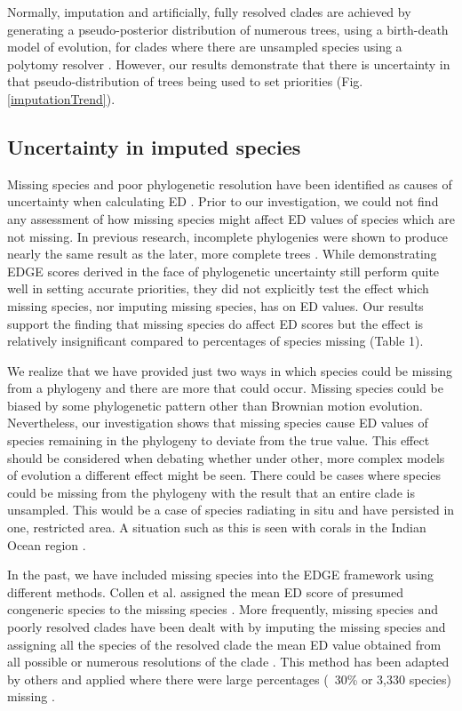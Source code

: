 \documentclass[12pt,english]{article}
\begin{document}
Normally, imputation and artificially, fully resolved clades are achieved by
generating a pseudo-posterior distribution of numerous trees, using a
birth-death model of evolution, for clades where there are unsampled species
using a polytomy resolver \autocite{Kuhn2011}. However, our results demonstrate
that there is uncertainty in that pseudo-distribution of trees being used to set
priorities (Fig. \ref{imputationTrend}).

\subsection*{Uncertainty in imputed species}
Missing species and poor phylogenetic resolution have been identified as causes
of uncertainty when calculating ED \autocite{Isaac2007}. Prior to our
investigation, we could not find any assessment of how missing species might
affect ED values of species which are not missing. In previous research,
incomplete phylogenies were shown to produce nearly the same result as the
later, more complete trees \autocite{Curnick2015}. While demonstrating EDGE
scores derived in the face of phylogenetic uncertainty still perform quite well
in setting accurate priorities, they did not explicitly test the effect which
missing species, nor imputing missing species, has on ED values. Our results
support the finding that missing species do affect ED scores but the effect is
relatively insignificant compared to percentages of species missing (Table 1). 

We realize that we have provided just two ways in which species could be missing
from a phylogeny and there are more that could occur. Missing species could be
biased by some phylogenetic pattern other than Brownian motion evolution.
Nevertheless, our investigation shows that missing species cause ED values of
species remaining in the phylogeny to deviate from the true value. This effect
should be considered when debating whether under other, more complex models of
evolution a different effect might be seen. There could be cases where species
could be missing from the phylogeny with the result that an entire clade is
unsampled. This would be a case of species radiating in situ and have persisted
in one, restricted area. A situation such as this is seen with corals in the
Indian Ocean region \autocite{Arrigoni2012}.

In the past, we have included missing species into the EDGE framework using
different methods. Collen et al. assigned the mean ED score of presumed
congeneric species to the missing species \citeyear{Collen2011}. More
frequently, missing species and poorly resolved clades have been dealt with by
imputing the missing species and assigning all the species of the resolved clade
the mean ED value obtained from all possible or numerous resolutions of the
clade \autocite{Isaac2007; Isaac2012}. This method has been adapted by others
and applied where there were large percentages (~30\% or 3,330 species) missing
\autocite{Jetz2014}. 
\end{document}
